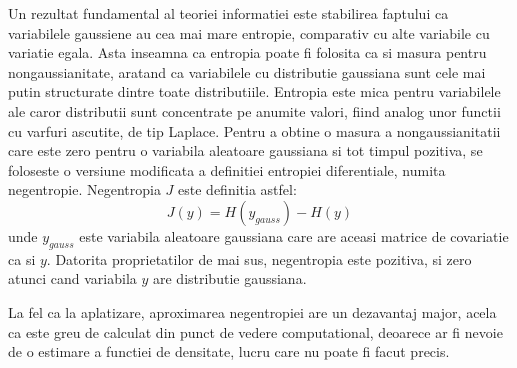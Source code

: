 \documentclass[12pt,oneside]{article}
\begin{document}
Un rezultat fundamental al teoriei informatiei este stabilirea faptului ca variabilele gaussiene au cea mai mare entropie, comparativ cu alte variabile cu variatie egala. Asta inseamna ca entropia poate fi folosita ca si masura pentru nongaussianitate, aratand ca variabilele cu distributie gaussiana sunt cele mai putin structurate dintre toate distributiile. Entropia este mica pentru variabilele ale caror distributii sunt concentrate pe anumite valori, fiind analog unor functii cu varfuri ascutite, de tip Laplace. Pentru a obtine o masura a nongaussianitatii care este zero pentru o variabila aleatoare gaussiana si tot timpul pozitiva, se foloseste o versiune modificata a definitiei entropiei diferentiale, numita negentropie. Negentropia $J$ este definitia astfel:
\begin{equation}
	J(y)=H(y_{gauss})-H(y)	
\end{equation}
unde $y_{gauss}$ este variabila aleatoare gaussiana care are aceasi matrice de covariatie ca si $y$. Datorita proprietatilor de mai sus, negentropia este pozitiva, si zero atunci cand variabila $y$ are distributie gaussiana. 

La fel ca la aplatizare, aproximarea negentropiei are un dezavantaj major, acela ca este greu de calculat din punct de vedere computational, deoarece ar fi nevoie de o estimare a functiei de densitate, lucru care nu poate fi facut precis. 
\end{document}
